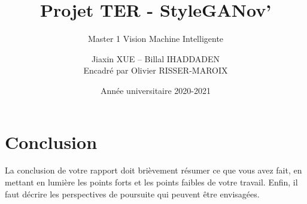 \documentclass[a4paper, 12pt]{report}
\institute{Université de Paris}
\title{Projet TER - StyleGANov'}
\subtitle{Master 1 Vision Machine Intelligente}
\author{Jiaxin \textsc{XUE} -- Billal \textsc{IHADDADEN}\\
{\small Encadré par Olivier \textsc{RISSER-MAROIX}}}
\date{Année universitaire 2020-2021}
\begin{document}
    \maketitle

    \romantableofcontents

    
    
    
    
    
    
    
    
    
    
    
    
    
    

	\chapter{Conclusion}
	La conclusion de votre rapport doit brièvement résumer ce que vous avez fait, en mettant en lumière les points forts et les points faibles de votre travail. Enfin, il faut décrire les perspectives de poursuite qui peuvent être envisagées.

	\printbibliography[heading=bibintoc,title={Références}]


	
\end{document}
